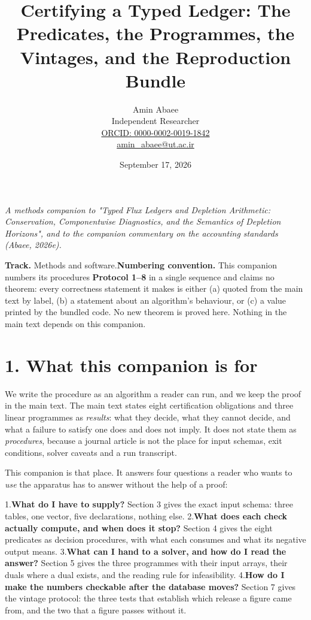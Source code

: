 \documentclass[11pt]{article}
\begin{document}
\title{Certifying a Typed Ledger: The Predicates, the Programmes, the Vintages, and the Reproduction Bundle}
\author{Amin Abaee\\[0.35em]
{\small Independent Researcher}\\[0.55em]
{\small\href{https://orcid.org/\allowbreak{}0000-0002-0019-1842}{ORCID: 0000-0002-0019-1842}}\\[0.3em]
{\small\href{mailto:amin\_abaee@ut.ac.ir}{amin\_abaee@ut.ac.ir}}}
\date{September 17, 2026}
\maketitle

\emph{A methods companion to "Typed Flux Ledgers and Depletion Arithmetic: Conservation, Componentwise Diagnostics, and the Semantics of Depletion Horizons", and to the companion commentary on the accounting standards (Abaee, 2026e).}

\textbf{Track.} Methods and software.\textbf{Numbering convention.} This companion numbers its procedures \textbf{Protocol 1--8} in a single sequence and claims no theorem: every correctness statement it makes is either (a) quoted from the main text by label, (b) a statement about an algorithm's behaviour, or (c) a value printed by the bundled code. No new theorem is proved here. Nothing in the main text depends on this companion.

\vspace{0.8em}

\section*{1. What this companion is for}\label{1-what-this-companion-is-for}

We write the procedure as an algorithm a reader can run, and we keep the proof in the main text. The main text states eight certification obligations and three linear programmes as \emph{results}: what they decide, what they cannot decide, and what a failure to satisfy one does and does not imply. It does not state them as \emph{procedures}, because a journal article is not the place for input schemas, exit conditions, solver caveats and a run transcript.

This companion is that place. It answers four questions a reader who wants to \emph{use} the apparatus has to answer without the help of a proof:

1.\textbf{What do I have to supply?} Section 3 gives the exact input schema: three tables, one vector, five declarations, nothing else. 2.\textbf{What does each check actually compute, and when does it stop?} Section 4 gives the eight predicates as decision procedures, with what each consumes and what its negative output means. 3.\textbf{What can I hand to a solver, and how do I read the answer?} Section 5 gives the three programmes with their input arrays, their duals where a dual exists, and the reading rule for infeasibility. 4.\textbf{How do I make the numbers checkable after the database moves?} Section 7 gives the vintage protocol: the three tests that establish which release a figure came from, and the two that a figure passes without it.
\end{document}
